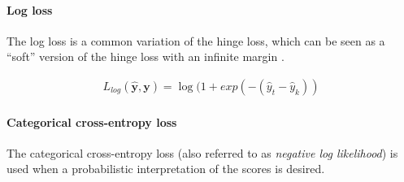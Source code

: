 \documentclass[jair,twoside,11pt,theapa]{article}
\newcommand{\m}[1]{\mathbf{#1}}%
\begin{document}
{\paragraph{Log loss} The log loss is a common variation of the hinge loss, which
can be seen as a ``soft'' version of the hinge loss with an infinite margin
\cite{lecun2006tutorial}.

\begin{align*}
    L_{log}(\m{\hat{y}},\m{y}) = \log(1 + exp(-(\hat{y}_t - \hat{y}_k) )
\end{align*}

%
%
%

\paragraph{Categorical cross-entropy loss} \label{sec:crossent}
The categorical cross-entropy loss (also referred to as \emph{negative log
likelihood}) is
used when a probabilistic interpretation of the scores is desired.

}
\end{document}
